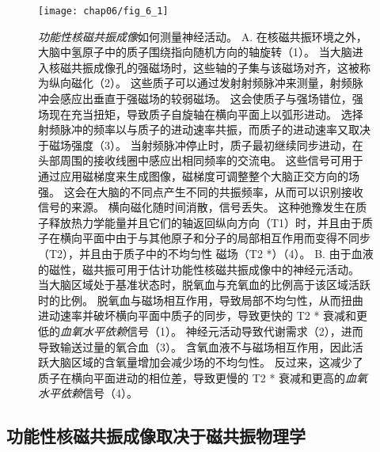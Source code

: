\begin{figure}[htbp]
	\centering
	\texttt{[image: chap06/fig\_6\_1]}
	\caption{\textit{功能性核磁共振成像}如何测量神经活动。
		A. 在核磁共振环境之外，大脑中氢原子中的质子围绕指向随机方向的轴旋转（1）。
		当大脑进入核磁共振成像孔的强磁场时，这些轴的子集与该磁场对齐，这被称为纵向磁化（2）。
		这些质子可以通过发射射频脉冲来测量，射频脉冲会感应出垂直于强磁场的较弱磁场。
		这会使质子与强场错位，强场现在充当扭矩，导致质子自旋轴在横向平面上以弧形进动。
		选择射频脉冲的频率以与质子的进动速率共振，而质子的进动速率又取决于磁场强度（3）。
		当射频脉冲停止时，质子最初继续同步进动，在头部周围的接收线圈中感应出相同频率的交流电。
		这些信号可用于通过应用磁梯度来生成图像，磁梯度可调整整个大脑正交方向的场强。
		这会在大脑的不同点产生不同的共振频率，从而可以识别接收信号的来源。
		横向磁化随时间消散，信号丢失。
		这种弛豫发生在质子释放热力学能量并且它们的轴返回纵向方向（T1）时，并且由于质子在横向平面中由于与其他原子和分子的局部相互作用而变得不同步（T2），并且由于质子中的不均匀性 磁场（T2 *）（4）。
		B. 由于血液的磁性，磁共振可用于估计功能性核磁共振成像中的神经元活动。
		当大脑区域处于基准状态时，脱氧血与充氧血的比例高于该区域活跃时的比例。
		脱氧血与磁场相互作用，导致局部不均匀性，从而扭曲进动速率并破坏横向平面中质子的同步，导致更快的 T2 * 衰减和更低的\textit{血氧水平依赖}信号（1）。
		神经元活动导致代谢需求（2），进而导致输送过量的氧合血（3）。
		含氧血液不与磁场相互作用，因此活跃大脑区域的含氧量增加会减少场的不均匀性。
		反过来，这减少了质子在横向平面进动的相位差，导致更慢的 T2 * 衰减和更高的\textit{血氧水平依赖}信号（4）。}
	\label{fig:6_1}
\end{figure}



\subsection{功能性核磁共振成像取决于磁共振物理学}

